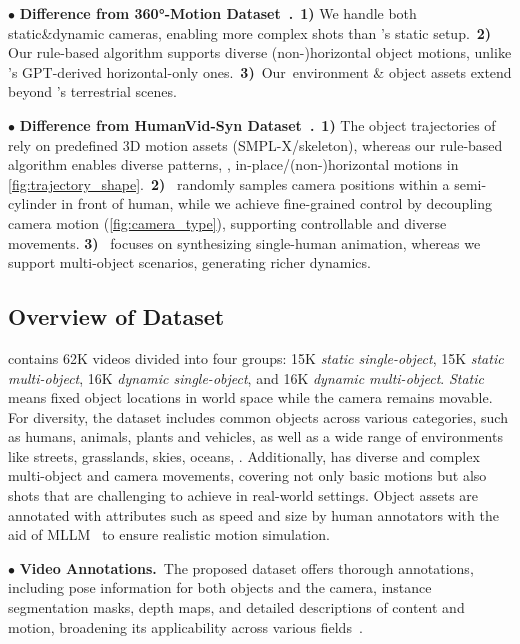 \noindent$\bullet$
\textbf{Difference from \ang{360}-Motion Dataset~\cite{3DTrajMaster}.}~\textbf{1)} We handle both static\&dynamic cameras, enabling more complex shots than \cite{3DTrajMaster}'s static setup.~\textbf{2)} Our rule-based algorithm supports diverse (non-)horizontal object motions, unlike \cite{3DTrajMaster}'s GPT-derived horizontal-only ones.~\textbf{3)}~Our~environment \& object assets extend beyond \cite{3DTrajMaster}'s terrestrial scenes.

\noindent$\bullet$
\textbf{Difference from HumanVid-Syn Dataset~\cite{HumanVid}.}{~\textbf{1)} The object trajectories of~\cite{HumanVid} rely on predefined 3D motion assets (SMPL-X/skeleton), whereas our rule-based algorithm enables diverse patterns, \eg, in-place/(non-)horizontal motions in \cref{fig:trajectory_shape}.~\textbf{2)}~\cite{HumanVid} randomly samples camera positions within a semi-cylinder in front of human, while we achieve fine-grained control by decoupling camera motion (\cref{fig:camera_type}), supporting controllable and diverse movements. \textbf{3)}~\cite{HumanVid} focuses on synthesizing single-human animation, whereas we support multi-object scenarios, generating richer dynamics.}

\subsection{Overview of \textbf{\datasetname} Dataset}

\datasetname contains 62K videos divided into four groups: 15K \emph{static single-object}, 15K \emph{static multi-object}, 16K \emph{dynamic single-object}, and 16K \emph{dynamic multi-object}. 
\emph{Static} means fixed object locations in world space while the camera remains movable. For diversity, the dataset includes common objects across various categories, such as humans, animals, plants and vehicles, as well as a wide range of environments like streets, grasslands, skies, oceans, \etc. Additionally, \datasetname has diverse and complex multi-object and camera movements, covering not only basic motions but also shots that are challenging to achieve in real-world settings. Object assets are annotated with attributes such as speed and size by human annotators with the aid of MLLM~\cite{InternVL} to ensure realistic motion simulation. 

\noindent$\bullet$
\textbf{Video Annotations.}~The proposed \datasetname dataset offers thorough annotations, including pose information for both objects and the camera, instance segmentation masks, depth maps, and detailed descriptions of content and motion, broadening its applicability across various fields~\cite{MOSE,MeViS,CharaConsist}.

